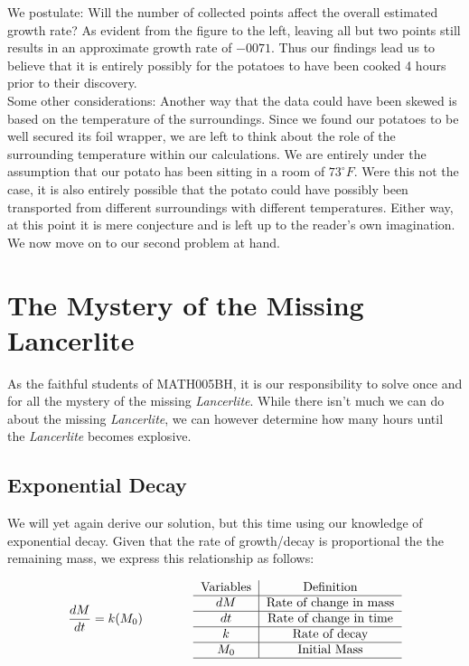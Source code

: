\documentclass{article}
\begin{document}
We postulate: Will the number of collected points affect the overall estimated growth rate?
As evident from the figure to the left, leaving all but two points still results in an
approximate growth rate of $-0071$. Thus our findings lead us to believe that it is entirely
possibly for the potatoes to have been cooked 4 hours prior to their discovery. \\
\newline
Some other considerations: Another way that the data could have been skewed is based on the
temperature of the surroundings. Since we found our potatoes to be well secured its foil
wrapper, we are left to think about the role of the surrounding temperature within our
calculations. We are entirely under the assumption that our potato has been sitting in a room
of $73^{\circ}F$. Were this not the case, it is also entirely possible that the potato could
have possibly been transported from different surroundings with different temperatures. Either
way, at this point it is mere conjecture and is left up to the reader's own imagination. We now
move on to our second problem at hand.

\newpage
\section{The Mystery of the Missing Lancerlite}
As the faithful students of MATH005BH, it is our responsibility to solve once and for all the mystery of the missing \textit{Lancerlite}. While there isn't much we can do about the missing \textit{Lancerlite}, we can however determine how many hours until the \textit{Lancerlite} becomes explosive. 

\subsection{Exponential Decay}
We will yet again derive our solution, but this time using our knowledge of exponential decay. Given that the rate of growth/decay is proportional the the remaining mass, we express this relationship as follows:


\begin{align*}
    \frac{dM}{dt}=k(M_0) \qquad\qquad
    \begin{tabular}{c|c}
     Variables & Definition  \\ \hline
     $dM$ & \text{Rate of change in mass} \\\hline 
     $dt$ & \text{Rate of change in time} \\\hline
     $k$ & \text{Rate of decay} \\\hline
     $M_0$ & \text{Initial Mass}\\\hline
\end{tabular}
\end{align*}
\end{document}
